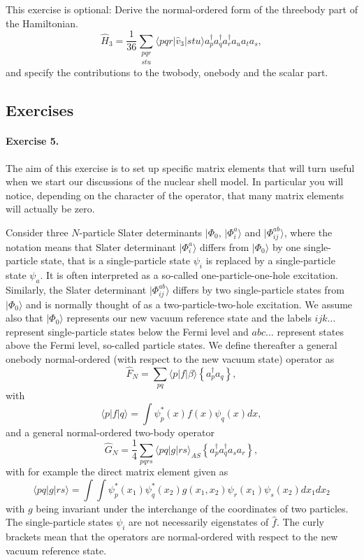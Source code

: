 \documentclass[%
twoside,                 %
final,                   %
10pt]{article}
\begin{document}
This exercise is optional: Derive the normal-ordered form of the threebody part of the Hamiltonian.
\[
\hat{H}_3 = \frac{1}{36} \sum_{\substack{pqr \\ stu}}
                 \langle pqr|\hat{v}_3|stu\rangle a^\dagger_p a^\dagger_q a^\dagger_r a_u a_t a_s,
\]
and specify the contributions to the twobody, onebody and the scalar part.





\subsection*{Exercises}

\paragraph{Exercise 5.}

The aim of this exercise is to set up specific matrix elements that will turn useful when we start our discussions of the nuclear shell model. In particular you will notice, depending on the character of the operator, that many matrix elements will actually be zero.

Consider three $N$-particle  Slater determinants  $|\Phi_0$, $|\Phi_i^a\rangle$ and $|\Phi_{ij}^{ab}\rangle$, where the notation means that 
Slater determinant $|\Phi_i^a\rangle$ differs from $|\Phi_0\rangle$ by one single-particle state, that is a single-particle
state $\psi_i$ is replaced by a single-particle state $\psi_a$. 
It is often interpreted as a so-called one-particle-one-hole excitation.
Similarly, the Slater determinant $|\Phi_{ij}^{ab}\rangle$
differs by two single-particle states from $|\Phi_0\rangle$ and is normally thought of as a two-particle-two-hole excitation.
We assume also that $|\Phi_0\rangle$ represents our new vacuum reference state
and the labels $ijk\dots$ represent single-particle states below the Fermi level and $abc\dots$ represent states above the Fermi level, so-called particle states.
We define thereafter a general onebody normal-ordered (with respect to the new vacuum state) operator 
as
\[
\hat{F}_N=\sum_{pq}\langle p |f |\beta\rangle \left\{a_{p}^{\dagger}a_{q}\right\}  ,
\]
with
\[
\langle p |f| q\rangle=\int \psi_{p}^{*}(x)f(x)\psi_{q}(x)dx ,
\]
and a general normal-ordered two-body operator
\[
\hat{G}_N = \frac{1}{4}\sum_{pqrs}
\langle pq |g| rs\rangle_{AS} \left\{a_{p}^{\dagger}a_{q}^{\dagger}a_{s}a_{r}\right\} ,
\]
with for example the direct matrix element given as
\[
\langle pq |g| rs\rangle=
\int\int \psi_{p}^{*}(x_{1})\psi_{q}^{*}(x_{2})g(x_{1}, x_{2})\psi_{r}(x_{1})\psi_{s}(x_{2})dx_{1}dx_{2}
\]
with $g$ being invariant under the interchange of the coordinates of two particles.
The single-particle states $\psi_i$ are not necessarily eigenstates of $\hat{f}$.  The curly brackets mean that the operators are normal-ordered with respect to the new vacuum reference state. 
\end{document}
